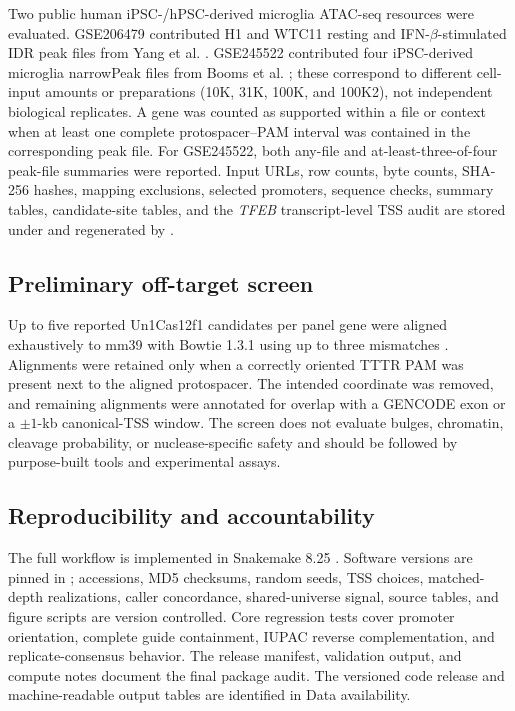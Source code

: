 \documentclass[11pt]{article}
\begin{document}
Two public human iPSC-/hPSC-derived microglia ATAC-seq resources were evaluated. GSE206479 contributed H1 and WTC11 resting and IFN-\(\beta\)-stimulated IDR peak files from Yang et al. \citep{yang2023advariants}. GSE245522 contributed four iPSC-derived microglia narrowPeak files from Booms et al. \citep{booms2024pdrisk}; these correspond to different cell-input amounts or preparations (10K, 31K, 100K, and 100K2), not independent biological replicates. A gene was counted as supported within a file or context when at least one complete protospacer--PAM interval was contained in the corresponding peak file. For GSE245522, both any-file and at-least-three-of-four peak-file summaries were reported. Input URLs, row counts, byte counts, SHA-256 hashes, mapping exclusions, selected promoters, sequence checks, summary tables, candidate-site tables, and the \textit{TFEB} transcript-level TSS audit are stored under  and regenerated by .

\subsection{Preliminary off-target screen}

Up to five reported Un1Cas12f1 candidates per panel gene were aligned exhaustively to mm39 with Bowtie 1.3.1 using up to three mismatches \citep{langmead2009bowtie}. Alignments were retained only when a correctly oriented TTTR PAM was present next to the aligned protospacer. The intended coordinate was removed, and remaining alignments were annotated for overlap with a GENCODE exon or a $\pm1$-kb canonical-TSS window. The screen does not evaluate bulges, chromatin, cleavage probability, or nuclease-specific safety and should be followed by purpose-built tools and experimental assays.

\subsection{Reproducibility and accountability}

The full workflow is implemented in Snakemake 8.25 \citep{molder2021snakemake}. Software versions are pinned in ; accessions, MD5 checksums, random seeds, TSS choices, matched-depth realizations, caller concordance, shared-universe signal, source tables, and figure scripts are version controlled. Core regression tests cover promoter orientation, complete guide containment, IUPAC reverse complementation, and replicate-consensus behavior. The release manifest, validation output, and compute notes document the final package audit. The versioned code release and machine-readable output tables are identified in Data availability.
\end{document}
